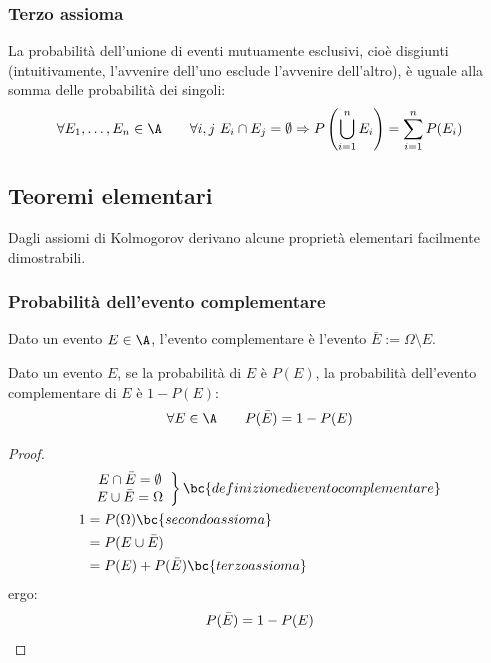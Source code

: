 \subsubsection{Terzo assioma}
La probabilità dell'unione di eventi mutuamente esclusivi, cioè disgiunti (intuitivamente, l'avvenire dell'uno esclude l'avvenire dell'altro), è uguale alla somma delle probabilità dei singoli:
\begin{equation*}
	\forall E_1,\dots,E_n\in\A\qquad \forall i,j~E_i\cap E_j = \emptyset \Rightarrow P\left( \bigcup_{i=1}^n E_i \right)=\sum_{i=1}^n P(E_i)
\end{equation*}



\subsection{Teoremi elementari}
Dagli assiomi di Kolmogorov derivano alcune proprietà elementari facilmente dimostrabili.


\subsubsection{Probabilità dell'evento complementare}
\begin{defin}
	Dato un evento $E\in\A$, l'evento complementare è l'evento $\bar E := \Omega\setminus E$.
\end{defin}
\begin{teor} \label{t:probcompl}
	Dato un evento $E$, se la probabilità di $E$ è $P(E)$, la probabilità dell'evento complementare di $E$ è $1-P(E)$:
	\begin{equation*}
		\forall E\in\A\qquad P(\bar E)=1-P(E)
	\end{equation*}
\end{teor}
\begin{proof}
	\begin{align*}
		  & \left.
		\begin{array}{cc}
			E\cap\bar E=\emptyset \\
			E\cup\bar E=\Omega
		\end{array} \right\}  \bc{definizione di evento complementare} \\
		1 & = P(\Omega)        \bc{secondo assioma}                                  \\
		  & = P(E\cup\bar E)                                                         \\
		  & = P(E)+P(\bar E)   \bc{terzo assioma}
	\end{align*}
	ergo:
	\begin{equation*}
		P(\bar E)=1-P(E) \qedhere
	\end{equation*}
\end{proof}

